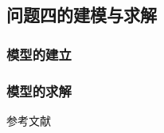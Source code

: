 \documentclass{cumcmthesis}
\begin{document}
\newpage
\subsection{问题四的建模与求解}
\subsubsection{模型的建立}


\subsubsection{模型的求解}

\newpage
\begin{thebibliography}{9} %
	 参考文献
\end{thebibliography}
\end{document}
